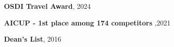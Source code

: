 
\begin{zitemize}
    \item \textbf{OSDI Travel Award}, 2024
    \item \textbf{AICUP - 1st place among 174 competitors },2021
    \item \textbf{Dean's List}, 2016
\end{zitemize}